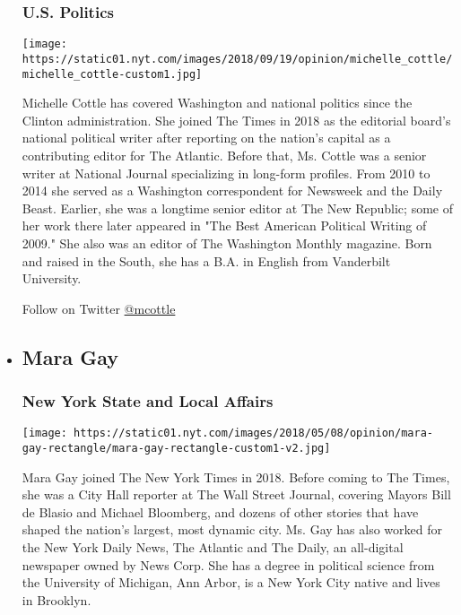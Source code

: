 \begin{itemize}
  \hypertarget{us-politics}{%
  \subsubsection{U.S. Politics}\label{us-politics}}

  \texttt{[image: https://static01.nyt.com/images/2018/09/19/opinion/michelle\_cottle/michelle\_cottle-custom1.jpg]}

  Michelle Cottle has covered Washington and national politics since the
  Clinton administration. She joined The Times in 2018 as the editorial
  board's national political writer after reporting on the nation's
  capital as a contributing editor for The Atlantic. Before that, Ms.
  Cottle was a senior writer at National Journal specializing in
  long-form profiles. From 2010 to 2014 she served as a Washington
  correspondent for Newsweek and the Daily Beast. Earlier, she was a
  longtime senior editor at The New Republic; some of her work there
  later appeared in "The Best American Political Writing of 2009." She
  also was an editor of The Washington Monthly magazine. Born and raised
  in the South, she has a B.A. in English from Vanderbilt University.

  Follow on Twitter \href{http://twitter.com/mcottle}{@mcottle}
\item
  \hypertarget{mara-gay}{%
  \subsection{Mara Gay}\label{mara-gay}}

  \hypertarget{new-york-state-and-local-affairs}{%
  \subsubsection{New York State and Local
  Affairs}\label{new-york-state-and-local-affairs}}

  \texttt{[image: https://static01.nyt.com/images/2018/05/08/opinion/mara-gay-rectangle/mara-gay-rectangle-custom1-v2.jpg]}

  Mara Gay joined The New York Times in 2018. Before coming to The
  Times, she was a City Hall reporter at The Wall Street Journal,
  covering Mayors Bill de Blasio and Michael Bloomberg, and dozens of
  other stories that have shaped the nation's largest, most dynamic
  city. Ms. Gay has also worked for the New York Daily News, The
  Atlantic and The Daily, an all-digital newspaper owned by News Corp.
  She has a degree in political science from the University of Michigan,
  Ann Arbor, is a New York City native and lives in Brooklyn.


\end{itemize}
